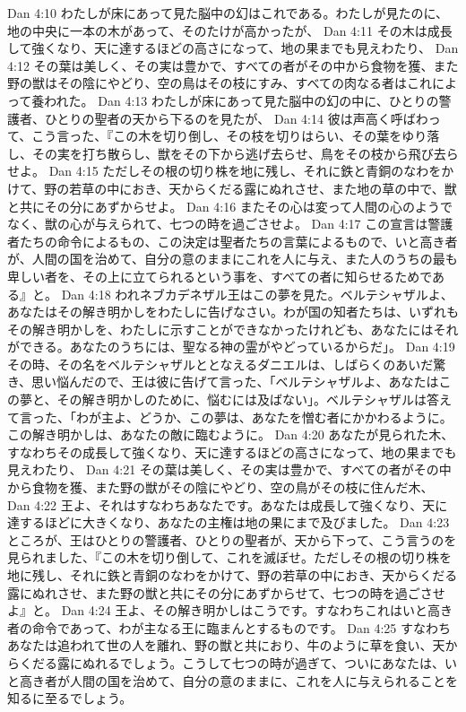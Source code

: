 Dan 4:10  わたしが床にあって見た脳中の幻はこれである。わたしが見たのに、地の中央に一本の木があって、そのたけが高かったが、
Dan 4:11  その木は成長して強くなり、天に達するほどの高さになって、地の果までも見えわたり、
Dan 4:12  その葉は美しく、その実は豊かで、すべての者がその中から食物を獲、また野の獣はその陰にやどり、空の鳥はその枝にすみ、すべての肉なる者はこれによって養われた。
Dan 4:13  わたしが床にあって見た脳中の幻の中に、ひとりの警護者、ひとりの聖者の天から下るのを見たが、
Dan 4:14  彼は声高く呼ばわって、こう言った、『この木を切り倒し、その枝を切りはらい、その葉をゆり落し、その実を打ち散らし、獣をその下から逃げ去らせ、鳥をその枝から飛び去らせよ。
Dan 4:15  ただしその根の切り株を地に残し、それに鉄と青銅のなわをかけて、野の若草の中におき、天からくだる露にぬれさせ、また地の草の中で、獣と共にその分にあずからせよ。
Dan 4:16  またその心は変って人間の心のようでなく、獣の心が与えられて、七つの時を過ごさせよ。
Dan 4:17  この宣言は警護者たちの命令によるもの、この決定は聖者たちの言葉によるもので、いと高き者が、人間の国を治めて、自分の意のままにこれを人に与え、また人のうちの最も卑しい者を、その上に立てられるという事を、すべての者に知らせるためである』と。
Dan 4:18  われネブカデネザル王はこの夢を見た。ベルテシャザルよ、あなたはその解き明かしをわたしに告げなさい。わが国の知者たちは、いずれもその解き明かしを、わたしに示すことができなかったけれども、あなたにはそれができる。あなたのうちには、聖なる神の霊がやどっているからだ」。
Dan 4:19  その時、その名をベルテシャザルととなえるダニエルは、しばらくのあいだ驚き、思い悩んだので、王は彼に告げて言った、「ベルテシャザルよ、あなたはこの夢と、その解き明かしのために、悩むには及ばない」。ベルテシャザルは答えて言った、「わが主よ、どうか、この夢は、あなたを憎む者にかかわるように。この解き明かしは、あなたの敵に臨むように。
Dan 4:20  あなたが見られた木、すなわちその成長して強くなり、天に達するほどの高さになって、地の果までも見えわたり、
Dan 4:21  その葉は美しく、その実は豊かで、すべての者がその中から食物を獲、また野の獣がその陰にやどり、空の鳥がその枝に住んだ木、
Dan 4:22  王よ、それはすなわちあなたです。あなたは成長して強くなり、天に達するほどに大きくなり、あなたの主権は地の果にまで及びました。
Dan 4:23  ところが、王はひとりの警護者、ひとりの聖者が、天から下って、こう言うのを見られました、『この木を切り倒して、これを滅ぼせ。ただしその根の切り株を地に残し、それに鉄と青銅のなわをかけて、野の若草の中におき、天からくだる露にぬれさせ、また野の獣と共にその分にあずからせて、七つの時を過ごさせよ』と。
Dan 4:24  王よ、その解き明かしはこうです。すなわちこれはいと高き者の命令であって、わが主なる王に臨まんとするものです。
Dan 4:25  すなわちあなたは追われて世の人を離れ、野の獣と共におり、牛のように草を食い、天からくだる露にぬれるでしょう。こうして七つの時が過ぎて、ついにあなたは、いと高き者が人間の国を治めて、自分の意のままに、これを人に与えられることを知るに至るでしょう。
